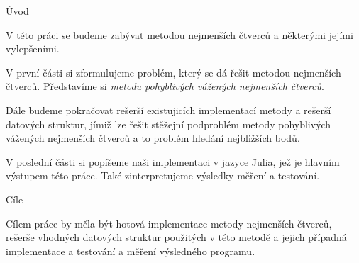 \chap Úvod

V této práci se budeme zabývat metodou nejmenších čtverců a některými jejími vylepšeními.

V první části si zformulujeme problém, který se dá řešit metodou nejmenších čtverců. Představíme si {\it metodu pohyblivých vážených nejmenších čtverců}.

Dále budeme pokračovat rešerší existujicích implementací metody a rešerší datových struktur, jímiž lze řešit stěžejní podproblém metody pohyblivých vážených nejmenších čtverců a to problém hledání nejbližších bodů.

V poslední části si popíšeme naši implementaci v jazyce Julia, jež je hlavním výstupem této práce. Také zinterpretujeme výsledky měření a testování.

\sec Cíle

Cílem práce by měla být hotová implementace metody nejmenších čtverců, rešerše vhodných datových struktur použitých v této metodě a jejich případná implementace a testování a měření výsledného programu.
